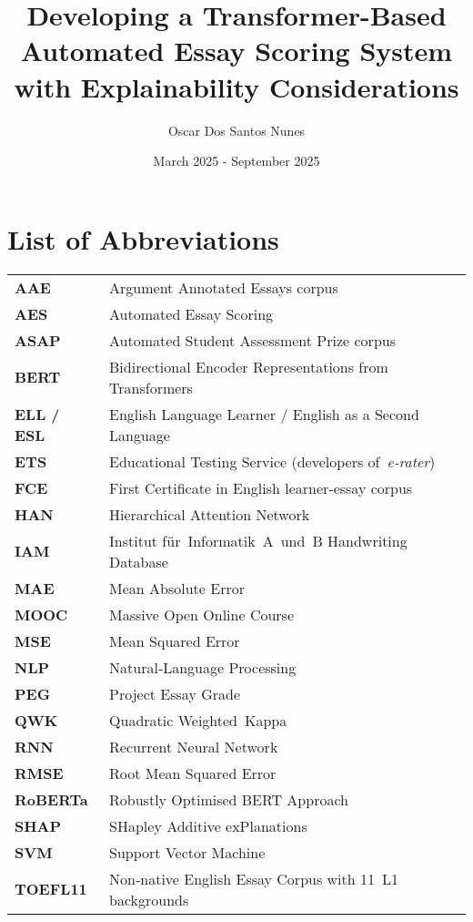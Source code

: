 \documentclass[10pt]{report}
\begin{document}
\title{Developing a Transformer-Based Automated Essay Scoring System with Explainability Considerations}
\author{Oscar Dos Santos Nunes}
\date{March 2025 - September 2025}
\maketitle

\tableofcontents
\newpage

\chapter*{List of Abbreviations}

\begin{center}
\renewcommand{\arraystretch}{1.2}
\begin{tabular}{@{}lp{}@{}}
\textbf{AAE}      & Argument Annotated Essays corpus \\
\textbf{AES}      & Automated Essay Scoring \\
\textbf{ASAP}     & Automated Student Assessment Prize corpus \\
\textbf{BERT}     & Bidirectional Encoder Representations from Transformers \\
\textbf{ELL / ESL}& English Language Learner / English as a Second Language \\
\textbf{ETS}      & Educational Testing Service (developers of \textit{e‑rater}) \\
\textbf{FCE}      & First Certificate in English learner‑essay corpus \\
\textbf{HAN}      & Hierarchical Attention Network \\
\textbf{IAM}      & Institut für Informatik A und B Handwriting Database \\
\textbf{MAE}      & Mean Absolute Error \\
\textbf{MOOC}     & Massive Open Online Course \\
\textbf{MSE}      & Mean Squared Error \\
\textbf{NLP}      & Natural‑Language Processing \\
\textbf{PEG}      & Project Essay Grade \\
\textbf{QWK}      & Quadratic Weighted Kappa \\
\textbf{RNN}      & Recurrent Neural Network \\
\textbf{RMSE}     & Root Mean Squared Error \\
\textbf{RoBERTa}  & Robustly Optimised BERT Approach \\
\textbf{SHAP}     & SHapley Additive exPlanations \\
\textbf{SVM}      & Support Vector Machine \\
\textbf{TOEFL11}  & Non‑native English Essay Corpus with 11 L1 backgrounds \\
\end{tabular}
\end{center}
\end{document}
